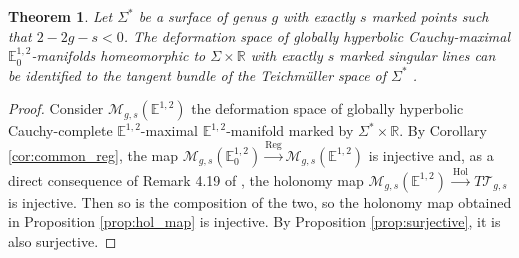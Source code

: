 \documentclass[a4paper,12pt]{article}
\def\M{\mathcal{M}}
\def\T{\mathcal{T}}
\def\RR{\mathbb{R}}
\newcommand{\mass}[1]{{\mathbb E}^{1,2}_{#1}}
\def\Reg{\mathrm{Reg}}
\def\reg{\Reg}
\newtheorem{theo}{Theorem}    %
\begin{document}
\begin{theo}\label{theo:princ} Let $\Sigma^*$ be a surface of genus $g$ with exactly $s$ marked points such that $2-2g-s<0$. The deformation space of globally hyperbolic Cauchy-maximal $\mass{0}$-manifolds homeomorphic to $\Sigma\times \RR$ with exactly $s$ marked singular lines can be identified to the tangent bundle of the Teichmüller space of $\Sigma^*$ .
\end{theo}
\begin{proof} 
Consider $\M_{g,s}(\mass{})$ the deformation space of globally hyperbolic Cau\-chy-complete $\mass{}$-maximal $\mass{}$-manifold marked by $\Sigma^*\times \RR$. 
 By Corol\-la\-ry \ref{cor:common_reg}, the map $\M_{g,s}(\mass{0})\xrightarrow{\reg}\M_{g,s}(\mass{})$ is injective and, as a direct 
 consequence of  Remark 4.19  of 
 \cite{barbot_globally_2004}, the holonomy map $ \M_{g,s}(\mass{})\xrightarrow{~\mathrm{Hol}~} T\T_{g,s}$ is injective. Then so is the composition of the two, so the holonomy map obtained in Proposition \ref{prop:hol_map} is injective. By Proposition \ref{prop:surjective},  it is also surjective.
\end{proof}




	
\end{document}

